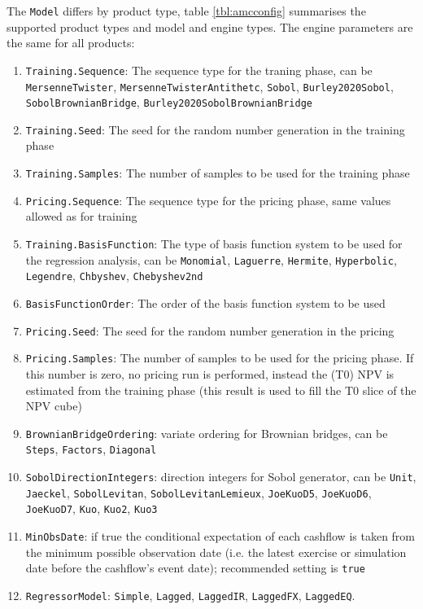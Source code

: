 \documentclass[12pt, a4paper]{article}
\begin{document}
The \verb+Model+ differs by product type, table \ref{tbl:amcconfig} summarises the supported product types and model and
engine types. The engine parameters are the same for all products:

\begin{enumerate}
\item \verb+Training.Sequence+: The sequence type for the traning phase, can be \verb+MersenneTwister+,
  \verb+MersenneTwisterAntithetc+, \verb+Sobol+, \verb+Burley2020Sobol+, \verb+SobolBrownianBridge+,
  \verb+Burley2020SobolBrownianBridge+
\item \verb+Training.Seed+: The seed for the random number generation in the training phase
\item \verb+Training.Samples+: The number of samples to be used for the training phase
\item \verb+Pricing.Sequence+: The sequence type for the pricing phase, same values allowed as for training
\item \verb+Training.BasisFunction+: The type of basis function system to be used for the regression analysis, can be
  \verb+Monomial+, \verb+Laguerre+, \verb+Hermite+, \verb+Hyperbolic+, \verb+Legendre+, \verb+Chbyshev+,
  \verb+Chebyshev2nd+
\item \verb+BasisFunctionOrder+: The order of the basis function system to be used
\item \verb+Pricing.Seed+: The seed for the random number generation in the pricing
\item \verb+Pricing.Samples+: The number of samples to be used for the pricing phase. If this number is zero, no pricing
  run is performed, instead the (T0) NPV is estimated from the training phase (this result is used to fill the T0 slice
  of the NPV cube)
\item \verb+BrownianBridgeOrdering+: variate ordering for Brownian bridges, can be \verb+Steps+, \verb+Factors+,
  \verb+Diagonal+
\item \verb+SobolDirectionIntegers+: direction integers for Sobol generator, can be \verb+Unit+, \verb+Jaeckel+,
  \verb+SobolLevitan+, \verb+SobolLevitanLemieux+, \verb+JoeKuoD5+, \verb+JoeKuoD6+, \verb+JoeKuoD7+,
  \verb+Kuo+, \verb+Kuo2+, \verb+Kuo3+
\item \verb+MinObsDate+: if true the conditional expectation of each cashflow is taken from the minimum possible
  observation date (i.e. the latest exercise or simulation date before the cashflow's event date); recommended setting
  is \verb+true+
\item \verb+RegressorModel+: \verb+Simple+, \verb+Lagged+, \verb+LaggedIR+, \verb+LaggedFX+, \verb+LaggedEQ+.

\end{enumerate}
\end{document}
